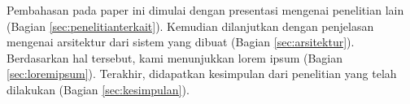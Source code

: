 Pembahasan pada paper ini dimulai dengan presentasi mengenai penelitian lain (Bagian \ref{sec:penelitianterkait}). Kemudian dilanjutkan dengan penjelasan mengenai arsitektur dari sistem yang dibuat (Bagian \ref{sec:arsitektur}). Berdasarkan hal tersebut, kami menunjukkan lorem ipsum (Bagian \ref{sec:loremipsum}).
Terakhir, didapatkan kesimpulan dari penelitian yang telah dilakukan (Bagian \ref{sec:kesimpulan}).
